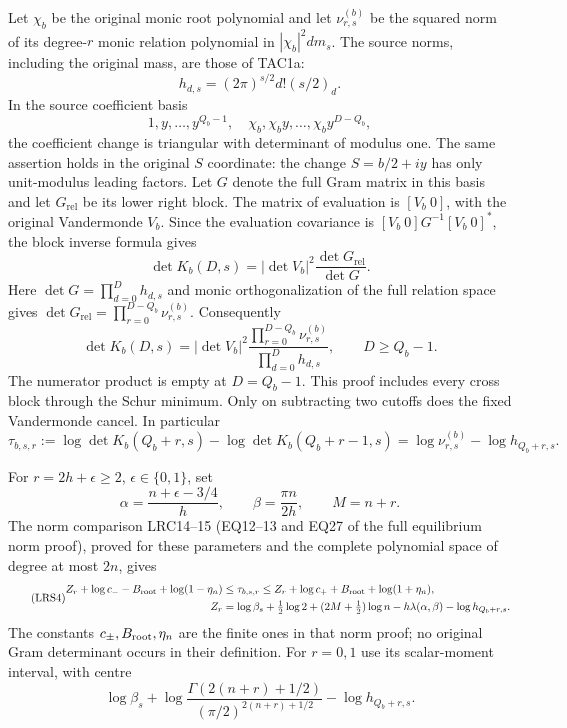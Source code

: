 Let $\chi_b$ be the original monic root polynomial and let
$\nu_{r,s}^{(b)}$ be the squared norm of its degree-$r$ monic relation
polynomial in $|\chi_b|^2dm_s$.  The source norms, including the
original mass, are those of TAC1a:
\[
 h_{d,s}=(2\pi)^{s/2}d!(s/2)_d.
\]
In the source coefficient basis
\[
 1,y,\ldots,y^{Q_b-1},\quad
 \chi_b,\chi_by,\ldots,\chi_by^{D-Q_b},
\]
the coefficient change is triangular with determinant of modulus one.
The same assertion holds in the original $S$ coordinate: the change
$S=b/2+iy$ has only unit-modulus leading factors.  Let $G$ denote the
full Gram matrix in this basis and let $G_{\mathrm{rel}}$ be its lower
right block.  The matrix of evaluation is $[V_b\ 0]$, with the
original Vandermonde $V_b$.  Since the evaluation covariance is
$[V_b\ 0]G^{-1}[V_b\ 0]^*$, the block inverse formula gives
\[
 \det K_b(D,s)=|\det V_b|^2\frac{\det G_{\mathrm{rel}}}{\det G}.
\]
Here $\det G=\prod_{d=0}^Dh_{d,s}$ and monic orthogonalization of
the full relation space gives
$\det G_{\mathrm{rel}}=\prod_{r=0}^{D-Q_b}\nu_{r,s}^{(b)}$.
Consequently
\begin{equation}\tag{LRS2}
 \det K_b(D,s)=|\det V_b|^2
 \frac{\prod_{r=0}^{D-Q_b}\nu_{r,s}^{(b)}}
      {\prod_{d=0}^{D}h_{d,s}},\qquad D\ge Q_b-1.
\end{equation}
The numerator product is empty at $D=Q_b-1$.  This proof includes
every cross block through the Schur minimum.  Only on subtracting
two cutoffs does the fixed Vandermonde cancel.  In particular
\begin{equation}\tag{LRS3}
 \tau_{b,s,r}:=\log\det K_b(Q_b+r,s)
              -\log\det K_b(Q_b+r-1,s)
     =\log\nu_{r,s}^{(b)}-\log h_{Q_b+r,s}.
\end{equation}

For $r=2h+\epsilon\ge2$, $\epsilon\in\{0,1\}$, set
\[
 \alpha=\frac{n+\epsilon-3/4}{h},\qquad
 \beta=\frac{\pi n}{2h},\qquad M=n+r.
\]
The norm comparison LRC14--15 (EQ12--13 and EQ27 of the full equilibrium
norm proof), proved for these parameters and the
complete polynomial space of degree at most $2n$, gives
\begin{equation}\tag{LRS4}
\begin{split}
 Z_r+\log c_- -B_{\rm root}+\log(1-\eta_n)
   &\le\tau_{b,s,r}\le
 Z_r+\log c_+ +B_{\rm root}+\log(1+\eta_n),\\
 Z_r&=\log\beta_s+\tfrac12\log2
       +(2M+\tfrac12)\log n-h\lambda(\alpha,\beta)
       -\log h_{Q_b+r,s}.
\end{split}
\end{equation}
The constants $c_\pm,B_{\rm root},\eta_n$ are the finite ones in that
norm proof; no original Gram determinant occurs in their definition.
For $r=0,1$ use its scalar-moment interval, with centre
\[
 \log\beta_s+\log\frac{\Gamma(2(n+r)+1/2)}
                              {(\pi/2)^{2(n+r)+1/2}}
                       -\log h_{Q_b+r,s}.
\]

